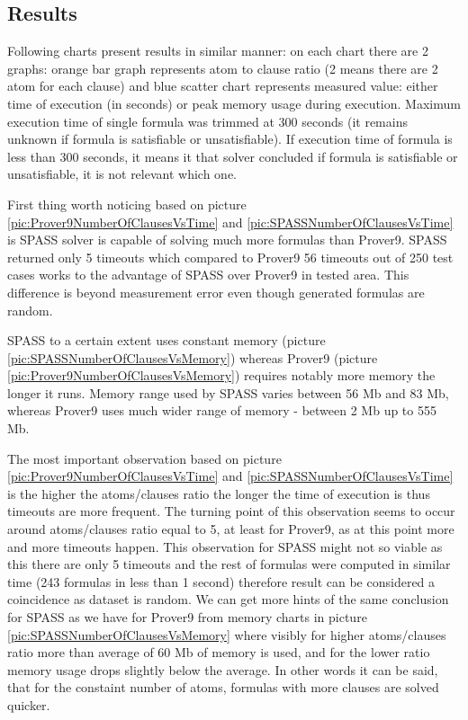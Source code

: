 \subsection{Results}
\label{sec:Results}

Following charts present results in similar manner: on each chart there are 2 graphs: orange bar graph represents atom to clause ratio (2 means there are 2 atom for each clause) and blue scatter chart represents measured value: either time of execution (in seconds) or peak memory usage during execution. Maximum execution time of single formula was trimmed at 300 seconds (it remains unknown if formula is satisfiable or unsatisfiable). If execution time of formula is less than 300 seconds, it means it that solver concluded if formula is satisfiable or unsatisfiable, it is not relevant which one.

First thing worth noticing based on picture \ref{pic:Prover9NumberOfClausesVsTime} and \ref{pic:SPASSNumberOfClausesVsTime} is SPASS solver is capable of solving much more formulas than Prover9. SPASS returned only 5 timeouts which compared to Prover9 56 timeouts out of 250 test cases works to the advantage of SPASS over Prover9 in tested area. This difference is beyond measurement error even though generated formulas are random. 

SPASS to a certain extent uses constant memory (picture \ref{pic:SPASSNumberOfClausesVsMemory}) whereas Prover9 (picture \ref{pic:Prover9NumberOfClausesVsMemory}) requires notably more memory the longer it runs. Memory range used by SPASS varies between 56 Mb and 83 Mb, whereas Prover9 uses much wider range of memory - between 2 Mb up to 555 Mb.

The most important observation based on picture \ref{pic:Prover9NumberOfClausesVsTime} and \ref{pic:SPASSNumberOfClausesVsTime} is the higher the atoms/clauses ratio the longer the time of execution is thus timeouts are more frequent. The turning point of this observation seems to occur around atoms/clauses ratio equal to 5, at least for Prover9, as at this point more and more timeouts happen. This observation for SPASS might not so viable as this there are only 5 timeouts and the rest of formulas were computed in similar time (243 formulas in less than 1 second) therefore result can be considered a coincidence as dataset is random. We can get more hints of the same conclusion for SPASS as we have for Prover9 from memory charts in picture \ref{pic:SPASSNumberOfClausesVsMemory} where visibly for higher atoms/clauses ratio more than average of 60 Mb of memory is used, and for the lower ratio memory usage drops slightly below the average.
In other words it can be said, that for the constaint number of atoms, formulas with more clauses are solved quicker.

